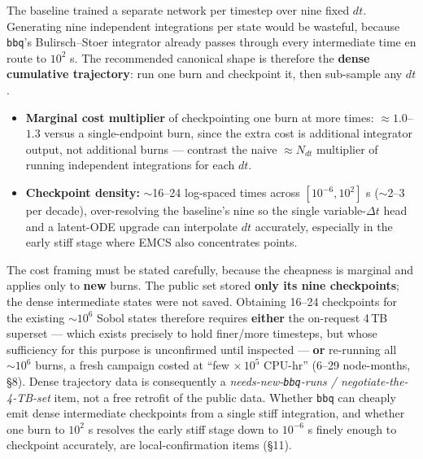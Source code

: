 \documentclass[11pt]{article}
\newcommand{\bbq}{\texttt{bbq}}
\begin{document}
The baseline trained a separate network per timestep over nine fixed $dt$. Generating nine independent integrations per state would be wasteful, because \bbq{}'s Bulirsch--Stoer integrator already passes through every intermediate time en route to $10^2$ s. The recommended canonical shape is therefore the \textbf{dense cumulative trajectory}: run one burn and checkpoint it, then sub-sample any $dt$.

\begin{itemize}
\item \textbf{Marginal cost multiplier} of checkpointing one burn at more times: $\approx 1.0$--$1.3$ versus a single-endpoint burn, since the extra cost is additional integrator output, not additional burns --- contrast the naive $\approx N_{dt}$ multiplier of running independent integrations for each $dt$.
\item \textbf{Checkpoint density:} $\sim$16--24 log-spaced times across $[10^{-6}, 10^2]$ s ($\sim$2--3 per decade), over-resolving the baseline's nine so the single variable-$\Delta t$ head and a latent-ODE upgrade can interpolate $dt$ accurately, especially in the early stiff stage where EMCS also concentrates points.
\end{itemize}

The cost framing must be stated carefully, because the cheapness is marginal and applies only to \textbf{new} burns. The public set stored \textbf{only its nine checkpoints}; the dense intermediate states were not saved. Obtaining 16--24 checkpoints for the existing $\sim 10^6$ Sobol states therefore requires \textbf{either} the on-request 4\,TB superset --- which exists precisely to hold finer/more timesteps, but whose sufficiency for this purpose is unconfirmed until inspected --- \textbf{or} re-running all $\sim 10^6$ burns, a fresh campaign costed at ``few $\times\,10^5$ CPU-hr'' (6--29 node-months, \S8). Dense trajectory data is consequently a \emph{needs-new-\bbq{}-runs / negotiate-the-4-TB-set} item, not a free retrofit of the public data. Whether \bbq{} can cheaply emit dense intermediate checkpoints from a single stiff integration, and whether one burn to $10^2$ s resolves the early stiff stage down to $10^{-6}$ s finely enough to checkpoint accurately, are local-confirmation items (\S11).
\end{document}
